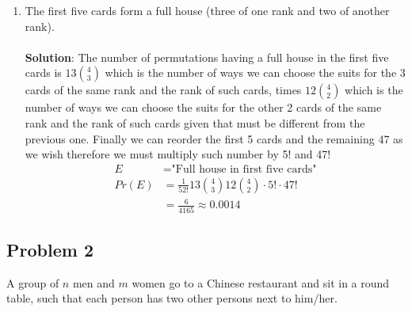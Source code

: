 \documentclass[a4paper]{article}
\begin{document}
\begin{enumerate}
\begin{enumerate}
            \item  The first five cards form a full house (three of one rank and two of another rank). \\ \\
            \textbf{Solution}: The number of permutations having a full house in the first five cards is $13\binom{4}{3}$ which is the number of ways we can choose the suits for the 3 cards of the same rank and the rank of such cards, times $12\binom{4}{2}$ which is the number of ways we can choose the suits for the other 2 cards of the same rank and the rank of such cards given that must be different from the previous one. Finally we can reorder the first 5 cards and the remaining 47 as we wish therefore we must multiply such number by 5! and 47!
            \begin{align*}
                E &= \text{"Full house in first five cards"} \\
                Pr(E) &= \frac{1}{52!} 13 \binom{4}{3} 12 \binom{4}{2} \cdot 5! \cdot 47! \\
                      &= \frac{6}{4165} \approx 0.0014
            \end{align*}
            
        \end{enumerate}
\end{enumerate}

\subsection*{Problem 2}

A group of $n$ men and $m$ women go to a Chinese restaurant and sit in a round table,
such that each person has two other persons next to him/her.
\end{document}
